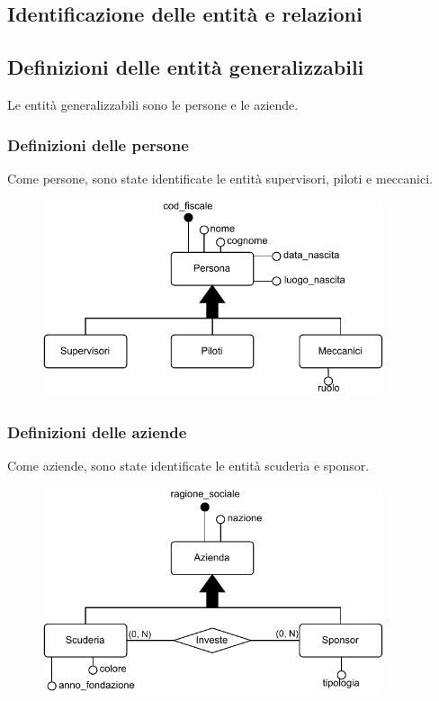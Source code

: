 \documentclass[11pt]{article}
\begin{document}
\subsection{Identificazione delle entità e relazioni}

\subsection{Definizioni delle entità generalizzabili}
Le entità generalizzabili sono le persone e le aziende.
\subsubsection{Definizioni delle persone}
Come persone, sono state identificate le entità supervisori, piloti e meccanici. 
\begin{figure}[H]
    \centering
    \includegraphics[width=10cm]{../er/gare_persone.pdf}
\end{figure}

\subsubsection{Definizioni delle aziende}
Come aziende, sono state identificate le entità scuderia e sponsor. 
\begin{figure}[H]
    \centering
    \includegraphics[width=10cm]{../er/gare_aziende.pdf}
\end{figure}
\end{document}
